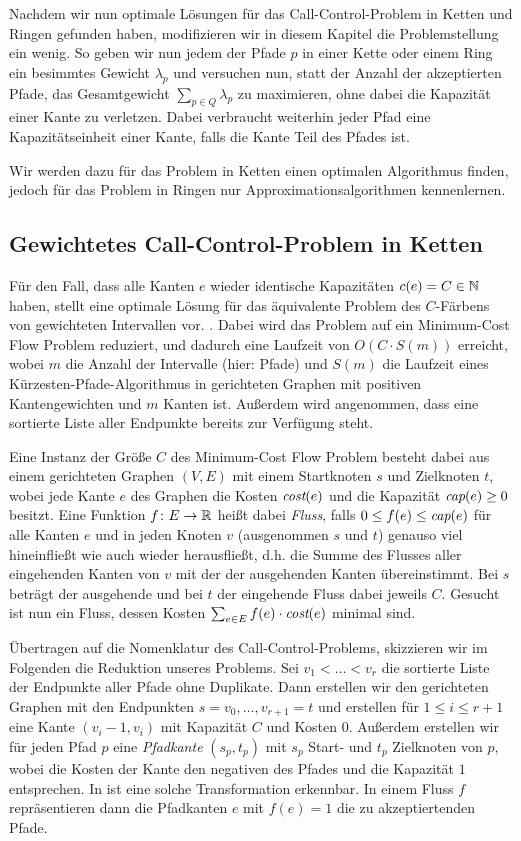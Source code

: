 Nachdem wir nun optimale Lösungen für das Call-Control-Problem in Ketten und Ringen gefunden haben, modifizieren
wir in diesem Kapitel die Problemstellung ein wenig.
So geben wir nun jedem der Pfade $p$ in einer Kette oder einem Ring ein besimmtes Gewicht $\lambda_p$ und versuchen
nun, statt der Anzahl der akzeptierten Pfade, das Gesamtgewicht $\sum_{p\in Q}\lambda_p$ zu maximieren, ohne dabei
die Kapazität einer Kante zu verletzen.
Dabei verbraucht weiterhin jeder Pfad eine Kapazitätseinheit einer Kante, falls die Kante Teil des Pfades ist.

Wir werden dazu für das Problem in Ketten einen optimalen Algorithmus finden, jedoch für das Problem in Ringen
nur Approximationsalgorithmen kennenlernen. 

\subsection{Gewichtetes Call-Control-Problem in Ketten}
Für den Fall, dass alle Kanten $e$ wieder identische Kapazitäten $c(e) = C \in \mathbb N$ haben, stellt 
eine optimale Lösung für das äquivalente Problem des $C$-Färbens von gewichteten Intervallen vor. .
Dabei wird das Problem auf ein Minimum-Cost Flow Problem reduziert, und dadurch eine Laufzeit von $O(C\cdot S(m))$
erreicht, wobei $m$ die Anzahl der Intervalle (hier: Pfade) und $S(m)$ die Laufzeit eines Kürzesten-Pfade-Algorithmus
in gerichteten Graphen mit positiven Kantengewichten und $m$ Kanten ist.
Außerdem wird angenommen, dass eine sortierte Liste aller Endpunkte bereits zur Verfügung steht. 

Eine Instanz der Größe $C$ des Minimum-Cost Flow Problem besteht dabei aus einem gerichteten Graphen $(V,E)$ mit
einem Startknoten $s$ und Zielknoten $t$, wobei jede Kante $e$ des Graphen die Kosten $\text{\em cost}(e)$ und die Kapazität
$\text{\em cap}(e) \geq 0$ besitzt.
Eine Funktion $f\colon E \rightarrow \mathbb R$ heißt dabei {\em Fluss}, falls  $0 \leq f(e) \leq \text{\em cap}(e)$ für alle
Kanten $e$ und in jeden Knoten $v$ (ausgenommen $s$ und $t$) genauso viel hineinfließt wie auch wieder herausfließt, d.h.
die Summe des Flusses aller eingehenden Kanten von $v$ mit der der ausgehenden Kanten übereinstimmt.
Bei $s$ beträgt der ausgehende und bei $t$ der eingehende Fluss dabei jeweils $C$.
Gesucht ist nun ein Fluss, dessen Kosten $\sum_{e\in E}f(e) \cdot \text{\em cost}(e)$ minimal sind.

Übertragen auf die Nomenklatur des Call-Control-Problems, skizzieren wir im Folgenden die Reduktion unseres Problems.
Sei $v_1 < \dots < v_r$ die sortierte Liste der Endpunkte aller Pfade ohne Duplikate.
Dann erstellen wir den gerichteten Graphen mit den Endpunkten $s = v_0, \dots, v_{r+1}=t$ und erstellen
für $1 \leq i \leq r+1$ eine Kante $(v_i-1, v_i)$ mit Kapazität $C$ und Kosten $0$.
Außerdem erstellen wir für jeden Pfad $p$ eine {\em Pfadkante} $(s_p, t_p)$ mit $s_p$ Start- und $t_p$ Zielknoten von $p$,
wobei die Kosten der Kante den negativen des Pfades und die Kapazität $1$ entsprechen.
In  ist eine solche Transformation erkennbar.
In einem Fluss $f$ repräsentieren dann die Pfadkanten $e$ mit $f(e)=1$ die zu akzeptiertenden Pfade.

